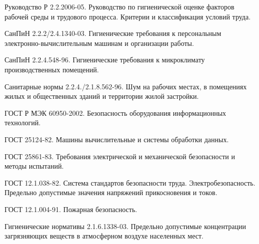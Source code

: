    Руководство Р 2.2.2006-05.
                                    Руководство по гигиенической оценке факторов
                                    рабочей среды и трудового процесса. Критерии
                                    и классификация условий труда.

    СанПиН 2.2.2/2.4.1340-03.
                                    Гигиенические требования к персональным
                                    электронно-вычислительным машинам и
                                    организации работы.

     СанПиН 2.2.4.548-96.
                                    Гигиенические требования к микроклимату
                                    производственных помещений.

  Санитарные нормы 2.2.4./2.1.8.562-96.
                                        Шум на рабочих местах, в помещениях
                                        жилых и общественных зданий и
                                        территории жилой застройки.

   ГОСТ Р МЭК 60950-2002.
                                    Безопасность оборудования информационных
                                    технологий.

 ГОСТ 25124-82.
                                Машины вычислительные и системы обработки данных.

 ГОСТ 25861-83.
                                Требования электрической и механической
                                безопасности и методы испытаний.

  ГОСТ 12.1.038-82.
                                    Система стандартов безопасности труда.
                                    Электробезопасность. Предельно допустимые
                                    значения напряжений прикосновения и токов.

  ГОСТ 12.1.004-91.
                                    Пожарная безопасность.

    Гигиенические нормативы 2.1.6.1338-03.
                                                Предельно допустимые концентрации загрязняющих
                                                веществ в атмосферном воздухе населенных мест.
